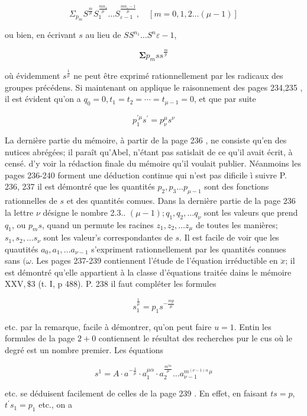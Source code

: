 \documentclass{article}
\begin{document}
\[
\Sigma_{p_{m}} S^{\frac{m}{\mu}} S_{1}^{\frac{m n_{1}}{\mu}} \ldots S_{\varepsilon-1}^{\frac{m n_{\varepsilon}-1}{\mu}}, \quad[m=0,1,2 \ldots(\mu-1)]
\]

ou bien, en écrivant \(s\) au lieu de \(S S^{n_{1}} \ldots S^{n} \varepsilon-1\),

\[
\mathbf{\Sigma} p_{m} s s^{\frac{m}{p}}
\]

où évidemment \(s^{\frac{1}{\mu}}\) ne peut être exprimé rationnellement par les radicaux des groupes
précédens. Si maintenant on applique le raisonnement des pages 234,235 , il est évident qu'on a \(q_{0}=0, t_{1}=t_{2}=\cdots=t_{\mu-1}=0\), et que par suite

\[
p_{1}^{\prime \mu} s^{\prime}=p_{\nu}^{\mu} s^{\nu}
\]

La dernière partie du mémoire, à partir de la page 236 , ne consiste qu'en des nutices abrégées; il paraît qu'Abel, n'étant pas satislait de ce qu'il avait écrit, à censé. d'y voir la rédaction finale du mémoire qu'il voulait publier. Néanmoins les pages 236-240 forment une déduction continue qui n'est pas dificile ì suivre P. 236, 237 il est démontré que les quantités \(p_{2}, p_{3} \ldots p_{\mu-1}\) sont des fonctions rationnelles de \(s\) et des quantités comues. Dans la dernière partie de la page 236 la lettre \(\nu\) désigne le nombre 2.3.. \((\mu-1) ; q_{1}, q_{2}, \ldots q_{\nu}\) sont les valeurs que prend \(q_{1}\), ou \(p_{m} s\), quand un permute les racines \(z_{1}, z_{2}, \ldots z_{\mu}\) de toutes les manières; \(s_{1}, s_{2}, \ldots s_{\nu}\) sont les valeur's correspondantes de \(s\). Il est facile de voir que les quautités \(a_{0}, a_{1}, \ldots a_{\nu-1}\) s'expriment rationnellement par les quantités connues sans \((\omega\). Les pages 237-239 contiennent l'étude de l'équation irréductible en \(\ddot{x}\); il est démontré qu'elle appartient à la classe d'équations traitée dains le mémoire \(\mathrm{XXV}, \$ 3\) (t. I, p 488). P. 238 il faut compléter les formules

\[
s_{1}^{\frac{1}{\mu}}=p_{1} s^{-\frac{m p}{\mu}}
\]

etc. par la remarque, facile à démontrer, qu'on peut faire \(u=1\). Entin les formules de la page \(2+0\) contiennent le résultat des recherches pur le cus où le degré est un nombre premier. Les équations

\[
s^{1}=A \cdot a^{-\frac{1}{\mu}} \cdot a_{1}^{\mu \alpha} \cdot a_{2}^{\frac{m^{3 \alpha}}{\mu}} \ldots a_{\nu-1}^{m^{(\nu-1) \alpha}}{ }^{\mu}
\]

etc. se déduisent facilement de celles de la page 239 . En effet, en faisant \(t s=p\), \(t^{\prime} s_{1}=p_{1}\) etc., on a
\end{document}
